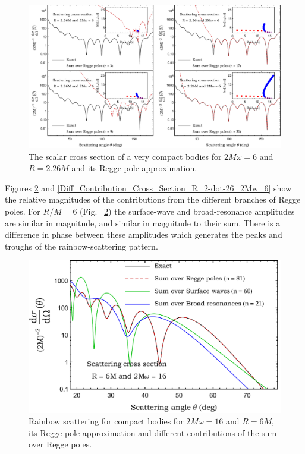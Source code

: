 \documentclass[aps,prd,longbibliography,reprint,twocolumn,amsmath,amssymb,amsfonts,showpacs,superscriptaddress]{revtex4-1}%
\begin{document}
\begin{figure}%
\centering
 \includegraphics[scale=0.50]{Scattering_Cross_Section_R_2-dot-26_2Mw_6}
\caption{\label{S_0_R_2-dot-26_2Mw_6_Exact_vs_CAM} The scalar cross section of a very compact bodies for $2M\omega=6$ and $R=2.26M$ and its Regge pole approximation.}
\end{figure}

Figures \ref{Rainbow_Cross_Section_R_6_2Mw_16} and \ref{Diff_Contribution_Cross_Section_R_2-dot-26_2Mw_6} show the relative magnitudes of the contributions from the different branches of Regge poles. For $R/M = 6$ (Fig.~ \ref{Rainbow_Cross_Section_R_6_2Mw_16}) the surface-wave and broad-resonance amplitudes are similar in magnitude, and similar in magnitude to their sum. There is a difference in phase between these amplitudes which generates the peaks and troughs of the rainbow-scattering pattern. 


\begin{figure}%
\centering
 \includegraphics[scale=0.50]{Rainbow_Cross_Section_R_6_2Mw_16}
\caption{\label{Rainbow_Cross_Section_R_6_2Mw_16} Rainbow scattering for compact bodies for $2M\omega=16$ and $R=6M$, its Regge pole approximation and different contributions of the sum over Regge poles.}
\end{figure}
\end{document}

